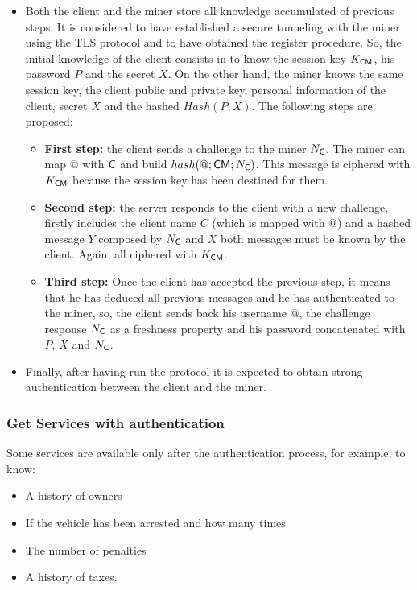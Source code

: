 \begin{itemize}
  \item Both the client and the miner store all knowledge accumulated
    of previous steps. It is considered to have established a secure tunneling 
    with the miner using the TLS protocol and to have obtained the register
    procedure. So, the initial knowledge of the client consists in to know 
    the session key $K_{\textsf{C}\textsf{M}}$, his password $P$ and the secret $X$. 
    On the other hand, the miner knows the same session key, the client public and
    private key, personal information of the client, secret $X$ and the hashed 
    $Hash(P,X)$. The following steps are proposed:
    \begin{itemize}
    \item \textbf{First step:} the client sends a challenge to the
      miner $N_{\textsf{C}}$. The miner can map $@$ with $\textsf{C}$ and build $hash(@;\textsf{C}\textsf{M}; N_{\textsf{C}})$. This message is ciphered with $K_{\textsf{C}\textsf{M}}$ because the session key has been destined for them. 
    \item \textbf{Second step:} the server responds to the client with a new challenge,
      firstly includes the client name $C$ (which is mapped with $@$) and a hashed message
      $Y$ composed by $N_{\textsf{C}}$ and $X$ both messages must be known by the client. Again,
      all ciphered with $K_{\textsf{C}\textsf{M}}$.
    \item \textbf{Third step:} Once the client has accepted the previous step, it means that
      he has deduced all previous messages and he has authenticated to the miner, so, the 
      client sends back his username $@$, the challenge response $N_{\textsf{C}}$ as a freshness
      property and his password concatenated with $P$, $X$ and $N_{\textsf{C}}$.
  \end{itemize}
\item Finally, after having run the protocol it is expected to obtain strong authentication
    between the client and the miner. 
\end{itemize}
 


\subsubsection{Get Services with authentication}
\label{ssec:getServAuth}
Some services are available only after the authentication process, for example, to know:
\begin{itemize}
    \item A history of owners
    \item If the vehicle has been arrested and how many times
    \item The number of penalties
    \item A history of taxes.
\end{itemize}

